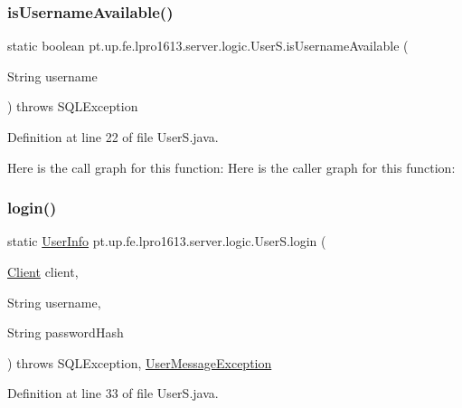 \subsubsection{\texorpdfstring{is\+Username\+Available()}{isUsernameAvailable()}}
{\footnotesize\ttfamily static boolean pt.\+up.\+fe.\+lpro1613.\+server.\+logic.\+User\+S.\+is\+Username\+Available (\begin{DoxyParamCaption}\item[{String}]{username }\end{DoxyParamCaption}) throws S\+Q\+L\+Exception\hspace{0.3cm}{\ttfamily [static]}}



Definition at line 22 of file User\+S.\+java.

Here is the call graph for this function\+:
Here is the caller graph for this function\+:
\hypertarget{classpt_1_1up_1_1fe_1_1lpro1613_1_1server_1_1logic_1_1_user_s_a501230613cfd4f8fee1949c3f116f0ac}{}\label{classpt_1_1up_1_1fe_1_1lpro1613_1_1server_1_1logic_1_1_user_s_a501230613cfd4f8fee1949c3f116f0ac} 
\subsubsection{\texorpdfstring{login()}{login()}}
{\footnotesize\ttfamily static \hyperlink{classpt_1_1up_1_1fe_1_1lpro1613_1_1sharedlib_1_1tuples_1_1_user_info}{User\+Info} pt.\+up.\+fe.\+lpro1613.\+server.\+logic.\+User\+S.\+login (\begin{DoxyParamCaption}\item[{\hyperlink{classpt_1_1up_1_1fe_1_1lpro1613_1_1server_1_1conn_1_1_client}{Client}}]{client,  }\item[{String}]{username,  }\item[{String}]{password\+Hash }\end{DoxyParamCaption}) throws S\+Q\+L\+Exception, \hyperlink{classpt_1_1up_1_1fe_1_1lpro1613_1_1sharedlib_1_1exceptions_1_1_user_message_exception}{User\+Message\+Exception}\hspace{0.3cm}{\ttfamily [static]}}



Definition at line 33 of file User\+S.\+java.

